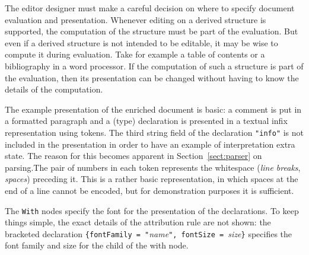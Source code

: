\documentclass{speauth}
\begin{document}
The editor designer must make a careful decision on where to specify document evaluation and presentation. Whenever editing on a derived structure is supported, the computation of the structure must be part of the evaluation. But even if a derived structure is not intended to be editable, it may be wise to compute it during evaluation. Take for example a table of contents or a bibliography in a word processor. If the computation of such a structure is part of the evaluation, then its presentation can be changed without having to know the details of the computation.

 The example presentation of the enriched document is basic: a comment is put in a formatted paragraph and a (type) declaration is presented in a textual infix representation using tokens. The third string field of the declaration \verb|"info"| is not included in the presentation in order to have an example of interpretation extra state. \bc The reason for this becomes apparent in Section~\ref{sect:parser} on parsing.\ec  The pair of numbers in each token represents the whitespace ({\em line breaks}, {\em spaces}) preceding it. This is a rather basic representation, in which spaces at the end of a line cannot be encoded, but for demonstration purposes it is sufficient.

The \verb|With| nodes specify the font for the presentation of the declarations. To keep things simple, the exact details of the attribution rule are not shown: the bracketed declaration \verb|{fontFamily = "|{\em name}\verb|", fontSize = |{\em size}\verb|}| specifies the font family and size for the child of the with node.
\end{document}
